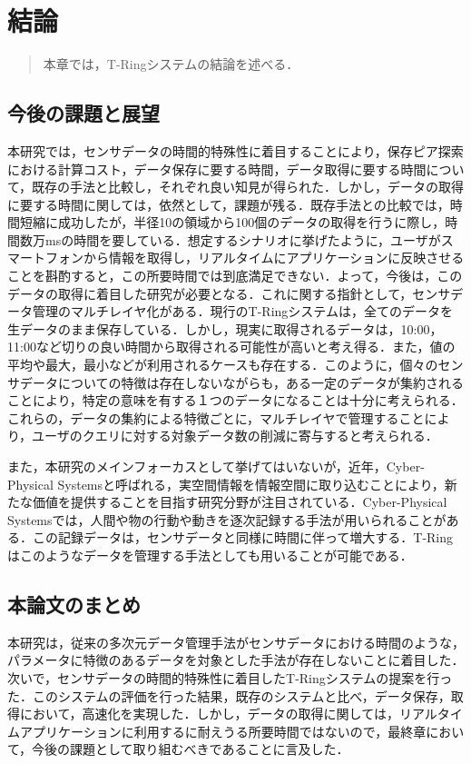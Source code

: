 \chapter{結論}
\begin{large}
\begin{quote}
本章では，T-Ringシステムの結論を述べる．
\end{quote}
\end{large}
\clearpage

\section{今後の課題と展望}
本研究では，センサデータの時間的特殊性に着目することにより，保存ピア探索における計算コスト，データ保存に要する時間，データ取得に要する時間について，既存の手法と比較し，それぞれ良い知見が得られた．しかし，データの取得に要する時間に関しては，依然として，課題が残る．既存手法との比較では，時間短縮に成功したが，半径10の領域から100個のデータの取得を行うに際し，時間数万msの時間を要している．想定するシナリオに挙げたように，ユーザがスマートフォンから情報を取得し，リアルタイムにアプリケーションに反映させることを斟酌すると，この所要時間では到底満足できない．よって，今後は，このデータの取得に着目した研究が必要となる．これに関する指針として，センサデータ管理のマルチレイヤ化がある．現行のT-Ringシステムは，全てのデータを生データのまま保存している．しかし，現実に取得されるデータは，10:00，11:00など切りの良い時間から取得される可能性が高いと考え得る．また，値の平均や最大，最小などが利用されるケースも存在する．このように，個々のセンサデータについての特徴は存在しないながらも，ある一定のデータが集約されることにより，特定の意味を有する１つのデータになることは十分に考えられる．これらの，データの集約による特徴ごとに，マルチレイヤで管理することにより，ユーザのクエリに対する対象データ数の削減に寄与すると考えられる．

また，本研究のメインフォーカスとして挙げてはいないが，近年，Cyber-Physical Systemsと呼ばれる，実空間情報を情報空間に取り込むことにより，新たな価値を提供することを目指す研究分野が注目されている．Cyber-Physical Systemsでは，人間や物の行動や動きを逐次記録する手法が用いられることがある．この記録データは，センサデータと同様に時間に伴って増大する．T-Ringはこのようなデータを管理する手法としても用いることが可能である．

\section{本論文のまとめ}
本研究は，従来の多次元データ管理手法がセンサデータにおける時間のような，パラメータに特徴のあるデータを対象とした手法が存在しないことに着目した．次いで，センサデータの時間的特殊性に着目したT-Ringシステムの提案を行った．このシステムの評価を行った結果，既存のシステムと比べ，データ保存，取得において，高速化を実現した．しかし，データの取得に関しては，リアルタイムアプリケーションに利用するに耐えうる所要時間ではないので，最終章において，今後の課題として取り組むべきであることに言及した．
